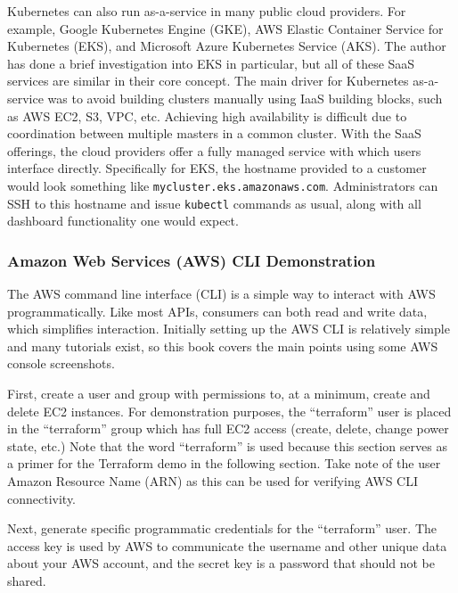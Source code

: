 Kubernetes can also run as-a-service in many public cloud providers. For
example, Google Kubernetes Engine (GKE), AWS Elastic Container Service for
Kubernetes (EKS), and Microsoft Azure Kubernetes Service (AKS). The author has
done a brief investigation into EKS in particular, but all of these SaaS
services are similar in their core concept. The main driver for Kubernetes
as-a-service was to avoid building clusters manually using IaaS building
blocks, such as AWS EC2, S3, VPC, etc. Achieving high availability is
difficult due to coordination between multiple masters in a common cluster.
With the SaaS offerings, the cloud providers offer a fully managed service
with which users interface directly. Specifically for EKS, the hostname
provided to a customer would look something like
\verb|mycluster.eks.amazonaws.com|. Administrators can SSH to this hostname and
issue \verb|kubectl| commands as usual, along with all dashboard functionality
one would expect.

\subsubsection{Amazon Web Services (AWS) CLI Demonstration}
The AWS command line interface (CLI) is a simple way to interact with AWS
programmatically. Like most APIs, consumers can both read and write data,
which simplifies interaction. Initially setting up the AWS CLI is relatively
simple and many tutorials exist, so this book covers the main points using
some AWS console screenshots.

First, create a user and group with permissions to, at a minimum, create and
delete EC2 instances. For demonstration purposes, the ``terraform'' user is
placed in the ``terraform'' group which has full EC2 access (create, delete,
change power state, etc.) Note that the word ``terraform'' is used because
this section serves as a primer for the Terraform demo in the following
section. Take note of the user Amazon Resource Name (ARN) as this can be used
for verifying AWS CLI connectivity.



Next, generate specific programmatic credentials for the ``terraform'' user. The
access key is used by AWS to communicate the username and other unique data
about your AWS account, and the secret key is a password that should not be
shared.

